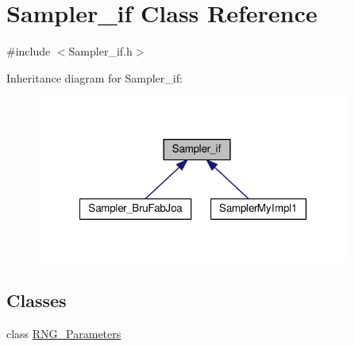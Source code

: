\hypertarget{class_sampler__if}{\section{Sampler\-\_\-if Class Reference}
\label{class_sampler__if}
}


{\ttfamily \#include $<$Sampler\-\_\-if.\-h$>$}



Inheritance diagram for Sampler\-\_\-if\-:
\nopagebreak
\begin{figure}[H]
\begin{center}
\leavevmode
\includegraphics[width=293pt]{class_sampler__if__inherit__graph}
\end{center}
\end{figure}
\subsection*{Classes}
\begin{DoxyCompactItemize}
\item 
class \hyperlink{class_sampler__if_1_1_r_n_g___parameters}{R\-N\-G\-\_\-\-Parameters}
\end{DoxyCompactItemize}

